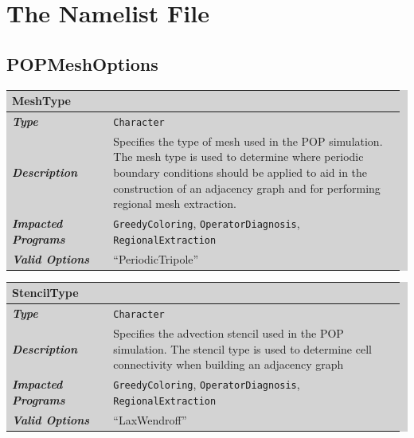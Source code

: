 \documentclass{softwaremanual}
\begin{document}
\section{The Namelist File}

\subsection{POPMeshOptions} \label{sec:POPMeshOptions}

\begingroup\setlength{\fboxsep}{0pt}
  \colorbox{lightgray}{
    \begin{tabular}{p{0.25\linewidth} p{0.725\linewidth}}
    \toprule
    \textbf{MeshType} & \\
    \midrule
    \textbf{\textit{Type}} & \texttt{Character} \\
    \midrule
    \textbf{\textit{Description}} & Specifies the type of mesh used in the POP simulation. The mesh type is used to determine where periodic boundary conditions should be applied to aid in the construction of an adjacency graph and for performing regional mesh extraction. \\
    \midrule
    \textbf{\textit{Impacted Programs}} & \texttt{GreedyColoring}, \texttt{OperatorDiagnosis}, \texttt{RegionalExtraction} \\
    \midrule
    \textbf{\textit{Valid Options}}  & ``PeriodicTripole'' \\
    \bottomrule
\end{tabular}
}\endgroup


\noindent\begingroup\setlength{\fboxsep}{0pt}
\colorbox{lightgray}{
\begin{tabular}{p{0.25\linewidth} p{0.725\linewidth}}
\toprule
\textbf{StencilType} & \\
\midrule
\textbf{\textit{Type}} & \texttt{Character} \\
\midrule
\textbf{\textit{Description}} & Specifies the advection stencil used in the POP simulation. The stencil type is used to determine cell connectivity when building an adjacency graph  \\
\midrule
\textbf{\textit{Impacted Programs}} & \texttt{GreedyColoring}, \texttt{OperatorDiagnosis}, \texttt{RegionalExtraction} \\
\midrule
\textbf{\textit{Valid Options}}  & ``LaxWendroff'' \\
\bottomrule
\end{tabular}
}\endgroup
\end{document}
